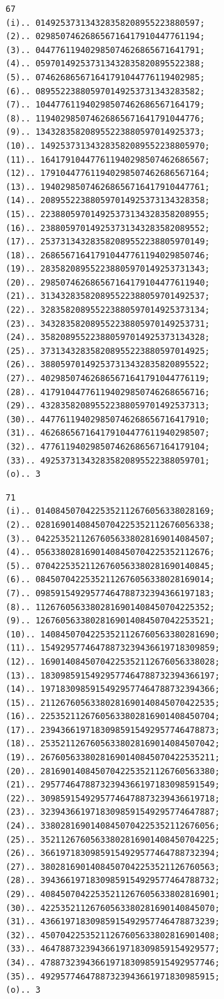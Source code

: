 \documentclass[10pt,a4paper]{article}
\begin{document}
\begin{verbatim}
67
(i).. 014925373134328358208955223880597;
(2).. 029850746268656716417910447761194;
(3).. 044776119402985074626865671641791;
(4).. 059701492537313432835820895522388;
(5).. 074626865671641791044776119402985;
(6).. 089552238805970149253731343283582;
(7).. 104477611940298507462686567164179;
(8).. 119402985074626865671641791044776;
(9).. 134328358208955223880597014925373;
(10).. 149253731343283582089552238805970;
(11).. 164179104477611940298507462686567;
(12).. 179104477611940298507462686567164;
(13).. 194029850746268656716417910447761;
(14).. 208955223880597014925373134328358;
(15).. 223880597014925373134328358208955;
(16).. 238805970149253731343283582089552;
(17).. 253731343283582089552238805970149;
(18).. 268656716417910447761194029850746;
(19).. 283582089552238805970149253731343;
(20).. 298507462686567164179104477611940;
(21).. 313432835820895522388059701492537;
(22).. 328358208955223880597014925373134;
(23).. 343283582089552238805970149253731;
(24).. 358208955223880597014925373134328;
(25).. 373134328358208955223880597014925;
(26).. 388059701492537313432835820895522;
(27).. 402985074626865671641791044776119;
(28).. 417910447761194029850746268656716;
(29).. 432835820895522388059701492537313;
(30).. 447761194029850746268656716417910;
(31).. 462686567164179104477611940298507;
(32).. 477611940298507462686567164179104;
(33).. 492537313432835820895522388059701;
(o).. 3
\end{verbatim}

\newpage
\setcounter{page}{421}

\begin{verbatim}
71
(i).. 01408450704225352112676056338028169;
(2).. 02816901408450704225352112676056338;
(3).. 04225352112676056338028169014084507;
(4).. 05633802816901408450704225352112676;
(5).. 07042253521126760563380281690140845;
(6).. 08450704225352112676056338028169014;
(7).. 09859154929577464788732394366197183;
(8).. 11267605633802816901408450704225352;
(9).. 12676056338028169014084507042253521;
(10).. 14084507042253521126760563380281690;
(11).. 15492957746478873239436619718309859;
(12).. 16901408450704225352112676056338028;
(13).. 18309859154929577464788732394366197;
(14).. 19718309859154929577464788732394366;
(15).. 21126760563380281690140845070422535;
(16).. 22535211267605633802816901408450704;
(17).. 23943661971830985915492957746478873;
(18).. 25352112676056338028169014084507042;
(19).. 26760563380281690140845070422535211;
(20).. 28169014084507042253521126760563380;
(21).. 29577464788732394366197183098591549;
(22).. 30985915492957746478873239436619718;
(23).. 32394366197183098591549295774647887;
(24).. 33802816901408450704225352112676056;
(25).. 35211267605633802816901408450704225;
(26).. 36619718309859154929577464788732394;
(27).. 38028169014084507042253521126760563;
(28).. 39436619718309859154929577464788732;
(29).. 40845070422535211267605633802816901;
(30).. 42253521126760563380281690140845070;
(31).. 43661971830985915492957746478873239;
(32).. 45070422535211267605633802816901408;
(33).. 46478873239436619718309859154929577;
(34).. 47887323943661971830985915492957746;
(35).. 49295774647887323943661971830985915;
(o).. 3
\end{verbatim}
\end{document}
